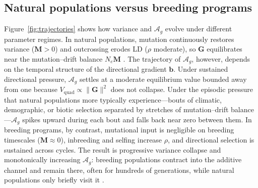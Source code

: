 \documentclass[9pt,twocolumn,twoside,lineno]{gsajnl}
\newcommand{\vect}[1]{\boldsymbol{#1}}
\newcommand{\mat}[1]{\mathbf{#1}}
\newcommand{\Ag}{\ensuremath{\mathcal{A}_{g}}\xspace}
\newcommand{\Vquad}{\ensuremath{V_{\text{quad}}}\xspace}
\begin{document}

\subsection{Natural populations versus breeding programs}

Figure~\ref{fig:trajectories} shows how variance and \Ag evolve under different parameter regimes. In natural populations, mutation continuously restores variance ($\mat{M} > 0$) and outcrossing erodes LD ($\rho$ moderate), so $\mat{G}$ equilibrates near the mutation--drift balance $N_e\mat{M}$ \citep{Turelli1988, TurelliBarton1994}. The trajectory of \Ag, however, depends on the temporal structure of the directional gradient $\vect{b}$. Under sustained directional pressure, \Ag settles at a moderate equilibrium value bounded away from one because $\Vquad \propto \|\mat{G}\|^2$ does not collapse. Under the episodic pressure that natural populations more typically experience---bouts of climatic, demographic, or biotic selection separated by stretches of mutation--drift balance---\Ag spikes upward during each bout and falls back near zero between them. In breeding programs, by contrast, mutational input is negligible on breeding timescales ($\mat{M} \approx 0$), inbreeding and selfing increase $\rho$, and directional selection is sustained across cycles. The result is progressive variance collapse and monotonically increasing \Ag: breeding populations contract into the additive channel and remain there, often for hundreds of generations, while natural populations only briefly visit it \citep{Technow2021}.
\end{document}
